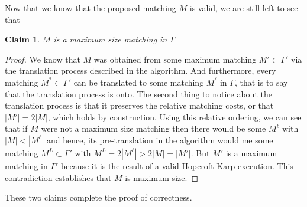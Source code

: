 \documentclass{article}
\newtheorem*{claim}{Claim}
\begin{document}
Now that we know that the proposed matching $M$ is valid, we are still left to see that \\

\begin{claim}
$M$ is a maximum size matching in $\Gamma$
\end{claim}
\begin{proof}
We know that $M$ was obtained from some maximum matching $M' \subset \Gamma'$ via the translation process described in the algorithm. And furthermore, every matching $M^* \subset \Gamma'$ can be translated to some matching $M^\ell$ in $\Gamma$, that is to say that the translation process is onto. The second thing to notice about the translation process is that it preserves the relative matching costs, or that $|M'| = 2|M|$, which holds by construction. Using this relative ordering, we can see that if $M$ were not a maximum size matching then there would be some $M^\ell$ with $|M| < |M^\ell|$ and hence, its pre-translation in the algorithm would me some matching $M^L \subset \Gamma'$ with $M^L = 2|M^\ell| > 2|M| = |M'|$. But $M'$ is a maximum matching in $\Gamma'$ because it is the result of a valid Hopcroft-Karp execution. This contradiction establishes that $M$ is maximum size.   
\end{proof}
These two claims complete the proof of correctness. 
\end{document}
